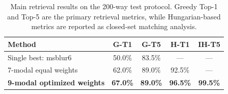 \begin{table}[htbp]
\centering
\caption{Main retrieval results on the 200-way test protocol. Greedy Top-1 and Top-5 are the primary retrieval metrics, while Hungarian-based metrics are reported as closed-set matching analysis.}
\label{tab:main_retrieval}
\begin{tabular}{lcccc}
\toprule
\textbf{Method} & \textbf{G-T1} & \textbf{G-T5} & \textbf{H-T1} & \textbf{IH-T5} \\
\midrule
Single best: msblur6 & 50.0\% & 83.5\% & --- & --- \\
7-modal equal weights & 62.0\% & 89.0\% & 92.5\% & --- \\
\textbf{9-modal optimized weights} & \textbf{67.0\%} & \textbf{89.0\%} & \textbf{96.5\%} & \textbf{99.5\%} \\
\bottomrule
\end{tabular}
\end{table}

